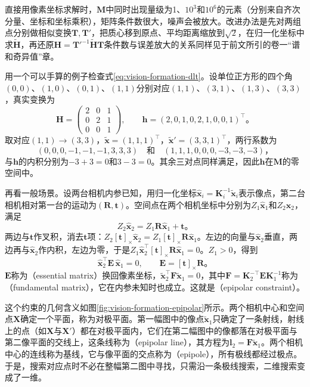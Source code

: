 直接用像素坐标求解时，$\bm M$中同时出现量级为1、$10^3$和$10^6$的元素（分别来自齐次分量、坐标和坐标乘积），矩阵条件数很大，噪声会被放大。改进办法是先对两组点分别做相似变换$\bm T,\bm T'$，把质心移到原点、平均距离缩放到$\sqrt2$，在归一化坐标中求$\tilde{\bm H}$，再还原$\bm H=\bm T'^{-1}\tilde{\bm H}\bm T$条件数与误差放大的关系同样见于前文所引的卷一“谱和奇异值”章。

用一个可以手算的例子检查式\eqref{eq:vision-formation-dlt}。设单位正方形的四个角$(0,0)$、$(1,0)$、$(0,1)$、$(1,1)$分别对应$(1,1)$、$(3,1)$、$(1,3)$、$(3,3)$，真实变换为
\[
  \bm H=\begin{pmatrix}2&0&1\\0&2&1\\0&0&1\end{pmatrix},\qquad
  \bm h=(2,0,1,0,2,1,0,0,1)^\top\text{。}
\]
取对应$(1,1)\to(3,3)$，$\tilde{\bm x}=(1,1,1)^\top$，$\tilde{\bm x}'=(3,3,1)^\top$，两行系数为
\[
  (0,0,0,-1,-1,-1,3,3,3)\quad\text{和}\quad(1,1,1,0,0,0,-3,-3,-3)\text{，}
\]
与$\bm h$的内积分别为$-3+3=0$和$3-3=0$。其余三对点同样满足，因此$\bm h$在$\bm M$的零空间中。

再看一般场景。设两台相机内参已知，用归一化坐标$\hat{\bm x}_i=\bm K_i^{-1}\tilde{\bm x}_i$表示像点，第二台相机相对第一台的运动为$(\bm R,\bm t)$。空间点在两个相机坐标中分别为$Z_1\hat{\bm x}_1$和$Z_2\hat{\bm x}_2$，满足
\[
  Z_2\hat{\bm x}_2=Z_1\bm R\hat{\bm x}_1+\bm t\text{。}
\]
两边与$\bm t$作叉积，消去$\bm t$项：$Z_2[\bm t]_\times\hat{\bm x}_2=Z_1[\bm t]_\times\bm R\hat{\bm x}_1$。左边的向量与$\hat{\bm x}_2$垂直，两边再与$\hat{\bm x}_2$作内积，左边为零，于是$Z_1\hat{\bm x}_2^\top[\bm t]_\times\bm R\hat{\bm x}_1=0$。$Z_1>0$，得到
\begin{equation}
  \hat{\bm x}_2^\top\bm E\,\hat{\bm x}_1=0,\qquad \bm E=[\bm t]_\times\bm R\text{。}
  \label{eq:vision-formation-essential}
\end{equation}
$\bm E$称为（essential matrix）换回像素坐标，$\tilde{\bm x}_2^\top\bm F\tilde{\bm x}_1=0$，其中$\bm F=\bm K_2^{-\top}\bm E\bm K_1^{-1}$称为（fundamental matrix），它在内参未知时也成立。这就是（epipolar constraint）。

这个约束的几何含义如图\ref{fig:vision-formation-epipolar}所示。两个相机中心和空间点$\bm X$确定一个平面，称为对极平面。第一幅图中的像点$\tilde{\bm x}_1$只确定了一条射线，射线上的点（如$\bm X$与$\bm X'$）都在对极平面内，它们在第二幅图中的像都落在对极平面与第二像平面的交线上，这条线称为（epipolar line），其方程为$\bm l_2=\bm F\tilde{\bm x}_1$。两个相机中心的连线称为基线，它与像平面的交点称为（epipole），所有极线都经过极点。于是，搜索对应点时不必在整幅第二图中寻找，只需沿一条极线搜索，二维搜索变成了一维。

